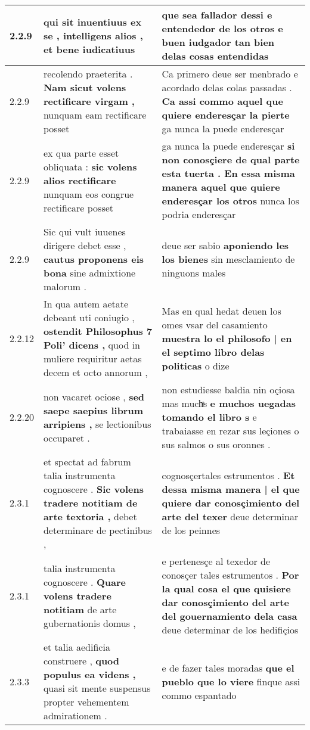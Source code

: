 \begin{tabular}{|p{1cm}|p{6.5cm}|p{6.5cm}|}
2.2.9 & qui sit inuentiuus ex se , \textbf{ intelligens alios , } et bene iudicatiuus & que sea fallador dessi \textbf{ e entendedor de los otros } e buen iudgador tan bien delas cosas entendidas \\\hline
2.2.9 & recolendo praeterita . \textbf{ Nam sicut volens rectificare virgam , } nunquam eam rectificare posset & Ca primero deue ser menbrado e acordado delas colas passadas . \textbf{ Ca assi commo aquel que quiere enderesçar la pierte } ga nunca la puede enderesçar \\\hline
2.2.9 & ex qua parte esset obliquata : \textbf{ sic volens alios rectificare } nunquam eos congrue rectificare posset & ga nunca la puede enderesçar \textbf{ si non conosçiere de qual parte esta tuerta . En essa misma manera aquel que quiere enderesçar los otros } nunca los podria enderesçar \\\hline
2.2.9 & Sic qui vult iuuenes dirigere debet esse , \textbf{ cautus proponens eis bona } sine admixtione malorum . & deue ser sabio \textbf{ aponiendo les los bienes } sin mesclamiento de ninguons males \\\hline
2.2.12 & In qua autem aetate debeant uti coniugio , \textbf{ ostendit Philosophus 7 Poli’ dicens , } quod in muliere requiritur aetas decem et octo annorum , & Mas en qual hedat deuen los omes vsar del casamiento \textbf{ muestra lo el philosofo | en el septimo libro delas politicas } o dize \\\hline
2.2.20 & non vacaret ociose , \textbf{ sed saepe saepius librum arripiens , } se lectionibus occuparet . & non estudiesse baldia nin oçiosa mas muchͣs \textbf{ e muchos uegadas tomando el libro s } e trabaiasse en rezar sus leçiones o sus salmos o sus oronnes . \\\hline
2.3.1 & et spectat ad fabrum talia instrumenta cognoscere . \textbf{ Sic volens tradere notitiam de arte textoria , } debet determinare de pectinibus , & cognosçertales estrumentos . \textbf{ Et dessa misma manera | el que quiere dar conosçimiento del arte del texer } deue determinar de los peinnes \\\hline
2.3.1 & talia instrumenta cognoscere . \textbf{ Quare volens tradere notitiam } de arte gubernationis domus , & e pertenesçe al texedor de conosçer tales estrumentos . \textbf{ Por la qual cosa el que quisiere dar conosçimiento del arte del gouernamiento dela casa } deue determinar de los hedifiçios \\\hline
2.3.3 & et talia aedificia construere , \textbf{ quod populus ea videns , } quasi sit mente suspensus propter vehementem admirationem . & e de fazer tales moradas \textbf{ que el pueblo que lo viere } finque assi commo espantado \\\hline

\end{tabular}
